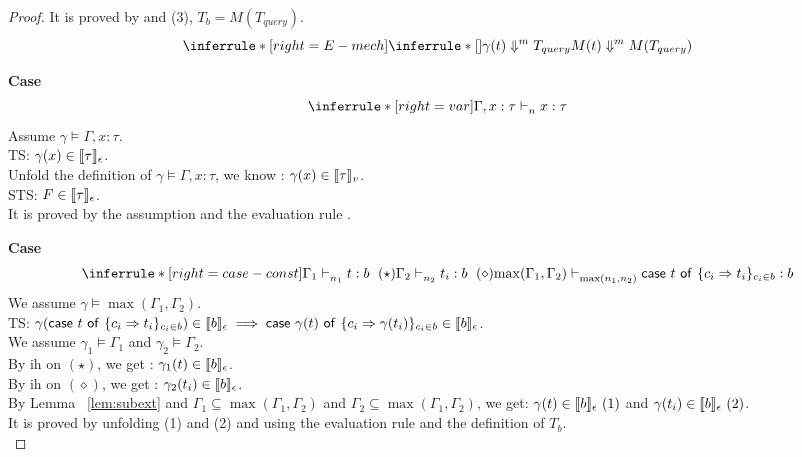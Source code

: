 \documentclass{article}
\begin{document}
\begin{proof}
   It is proved by  and (3), $T_b =M( T_{query})$.
   \[
     \inferrule*[ right=E-mech]
  { 
    \inferrule*[]
    {}
    {\eval{  \gamma(t)  }{ T_{query} }{m }  }
  }
  { \eval{  M(t)  }{ M(T_{query})  }{  m } }
   \]
  
    
     \noindent \textbf{Case} 
     \[
       \inferrule*[ right = var]
   {\empty}
   {\Gamma, x:\tau \jtype{n}{}{x}{\tau}  } 
     \]
    Assume $\gamma \vDash \Gamma, x: \tau $.\\
    TS: $\gamma(x) \in \llbracket {\tau} \rrbracket_{\epsilon} $.\\
    Unfold the definition of $\gamma \vDash{\Gamma, x: \tau}$, we know : $ \gamma(x) \in \llbracket {\tau} \rrbracket_{v} $. \\
    STS: $ F \in \llbracket {\tau} \rrbracket_{\epsilon} $.\\
    
   It is proved by the assumption and the evaluation rule .
 
 \noindent \textbf{Case}
  \[
   \inferrule*[ right = case-const ]
   {\Gamma_1 \jtype{n_1}{}{t}{b} ~(\star) \\ \Gamma_2 \jtype{n_2}{}{t_i}{b}~(\diamond) }
   {\max(\Gamma_1, \Gamma_2) \jtype{\max(n_1,n_2)}{}{\tcaseof{t}\ \{c_i \Rightarrow t_i\}_{c_i \in b} } {b} }
  \]
  We assume $ \gamma \vDash \max(\Gamma_1,\Gamma_2)$.\\
  TS: $\gamma( \mathsf{case}~t~\mathsf{of}\ \{c_i \Rightarrow t_i\}_{c_i \in b}  )  \in \llbracket {b} \rrbracket_{\epsilon} \implies \mathsf{case}~\gamma(t)~\mathsf{of}\ \{c_i \Rightarrow \gamma(t_i)\}_{c_i \in b} \in \llbracket {b} \rrbracket_{\epsilon}$.\\
  We assume $\gamma_1 \vDash \Gamma_1$ and $\gamma_2 \vDash \Gamma_2 $.\\
  By ih on $(\star)$, we get : $ \gamma_1(t) \in \llbracket {b} \rrbracket_{\epsilon}$.\\
  By ih on $(\diamond)$, we get : $ \gamma_2(t_i) \in \llbracket {b} \rrbracket_{\epsilon}$.\\
  By Lemma ~\ref{lem:subext} and $\Gamma_1 \subseteq \max(\Gamma_1,\Gamma_2) $ and $ \Gamma_2 \subseteq \max(\Gamma_1,\Gamma_2) $, we get: $\gamma(t) \in \llbracket {b} \rrbracket_{\epsilon}~(1) $ and $ \gamma(t_i) \in \llbracket {b} \rrbracket_{\epsilon}~(2)$.\\
  It is proved by unfolding (1) and (2) and using the evaluation rule  and the definition of $T_b$.\\ 
  

\end{proof}
\end{document}
